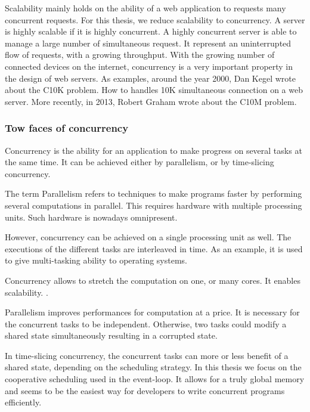 Scalability mainly holds on the ability of a web application to requests many concurrent requests.
For this thesis, we reduce scalability to concurrency.
A server is highly scalable if it is highly concurrent.
A highly concurrent server is able to manage a large number of simultaneous request.
It represent an uninterrupted flow of requests, with a growing throughput.
With the growing number of connected devices on the internet, concurrency is a very important property in the design of web servers.
As examples, around the year 2000, Dan Kegel wrote about the C10K problem.
How to handles 10K simultaneous connection on a web server.
More recently, in 2013, Robert Graham wrote about the C10M problem.

\subsubsection{Tow faces of concurrency}

Concurrency is the ability for an application to make progress on several tasks at the same time.
It can be achieved either by parallelism, or by time-slicing concurrency.

The term Parallelism refers to techniques to make programs faster by performing several computations in parallel. This requires hardware with multiple processing units. Such hardware is nowadays omnipresent.

However, concurrency can be achieved on a single processing unit as well.
The executions of the different tasks are interleaved in time.
As an example, it is used to give multi-tasking ability to operating systems. 

Concurrency allows to stretch the computation on one, or many cores.
It enables scalability.
.

Parallelism improves performances for computation at a price.
It is necessary for the concurrent tasks to be independent.
Otherwise, two tasks could modify a shared state simultaneously resulting in a corrupted state.

In time-slicing concurrency, the concurrent tasks can more or less benefit of a shared state, depending on the scheduling strategy.
In this thesis we focus on the cooperative scheduling used in the event-loop.
It allows for a truly global memory and seems to be the easiest way for developers to write concurrent programs efficiently.

